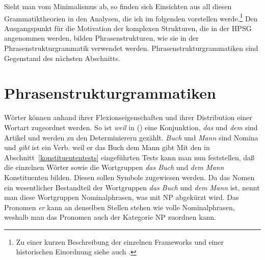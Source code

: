 \noindent
Sieht man vom Minimalismus ab, so finden sich Einsichten aus all diesen Grammatiktheorien
in den Analysen, die ich im folgenden vorstellen werde.\footnote{
  Zu einer kurzen Beschreibung der einzelnen Frameworks und einer historischen Einordnung
  siehe auch .%
}
Den Ausgangspunkt für die Motivation
der komplexen Strukturen, die in der HPSG angenommen werden, bilden Phrasenstrukturen, wie sie
in der Phrasenstrukturgrammatik verwendet werden. Phrasenstrukturgrammatiken sind Gegenstand des
nächsten Abschnitts.


\section{Phrasenstrukturgrammatiken}
\label{sec-psg}

Wörter können anhand ihrer Flexionseigenschaften und ihrer Distribution einer Wortart zugeordnet werden.
So ist \emph{weil} in () eine Konjunktion, \emph{das} und \emph {dem}
sind Artikel und werden zu den Determinierern gezählt. \emph{Buch} und \emph{Mann} sind Nomina und \emph{gibt}
ist ein Verb.
\ea
\label{bsp-weil-er-das-buch-dem-mann-gibt}
weil er das Buch dem Mann gibt
\z
Mit den in Abschnitt~\ref{konstituententests} eingeführten Tests kann man nun feststellen, daß
die einzelnen Wörter sowie die Wortgruppen \emph{das Buch} und \emph{dem Mann} Konstituenten bilden.
Diesen sollen Symbole zugewiesen werden. Da das Nomen ein wesentlicher Bestandteil der Wortgruppen
\emph{das Buch} und \emph{dem Mann} ist, nennt man diese Wortgruppen Nominalphrasen, was mit NP abgekürzt wird. Das Pronomen \emph{er}
kann an denselben Stellen stehen wie volle Nominalphrasen, weshalb man das Pronomen auch der
Kategorie NP zuordnen kann.

